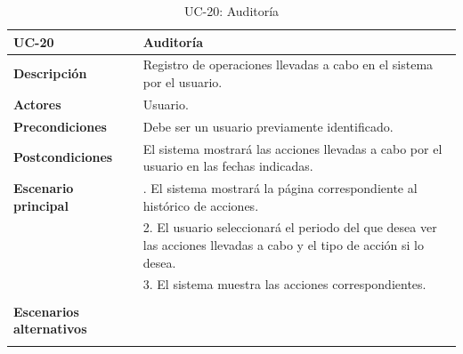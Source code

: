 \begin{table}[H]
  \begin{center}
    \begin{tabularx}{16.4cm}{|l|X|}
      \hline
      \textbf{UC-20} & \textbf{Auditoría}\\
      \hline
      \textbf{Descripción} & Registro de operaciones llevadas a cabo en el sistema por el usuario.\\
      \hline
      \textbf{Actores} & Usuario.\\
      \hline
      \textbf{Precondiciones} & Debe ser un usuario previamente identificado.\\
      \hline
      \textbf{Postcondiciones} & El sistema mostrará las acciones llevadas a cabo por el usuario en las fechas indicadas.\\
      \hline
      \textbf{Escenario principal} & \smallskip 1. El sistema mostrará la página correspondiente al histórico de acciones.\\
      & 2. El usuario seleccionará el periodo del que desea ver las acciones llevadas a cabo y el tipo de acción si lo desea.\\
      & 3. El sistema muestra las acciones correspondientes.\\
      & \\
      \hline
      \textbf{Escenarios alternativos} & \\
      & \\
      \hline
    \end{tabularx}
    \caption{UC-20: Auditoría}
    \label{tab:CU-auditorias}
  \end{center}
\end{table}


